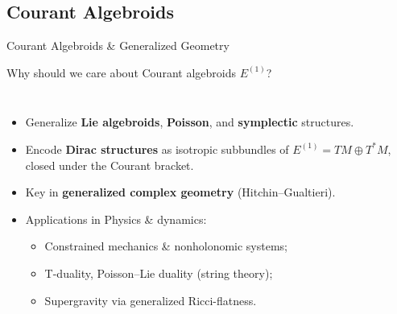 \documentclass[beamer,10pt,handout]{standalone}  \Handouttrue
\begin{document}
\subsection{Courant Algebroids}
\begin{frame}{Courant Algebroids \& Generalized Geometry}
   \begin{block}{Why should we care about Courant algebroids $E^{(1)}$?}	
	\vfill
\begin{columns}

    \begin{itemize}[<+-| alert@+>]
      \item[\ding{43}] Generalize \textbf{Lie algebroids}, \textbf{Poisson}, and \textbf{symplectic} structures.
      \item[\ding{72}] Encode \textbf{Dirac structures} as isotropic subbundles of $E^{(1)}= TM \oplus T^*M $, closed under the Courant bracket.
      \item[\ding{42}] Key in \textbf{generalized  complex geometry} (Hitchin–Gualtieri).
      \item[\ding{118}] Applications in Physics \& dynamics:
      \begin{itemize}
        \item Constrained mechanics \& nonholonomic systems;
        \item T-duality, Poisson–Lie duality (string theory);                         
        \item Supergravity via generalized Ricci-flatness.
      \end{itemize}
    \end{itemize}

\end{columns}
	\vfill
\end{block}
\end{frame}
\end{document}
